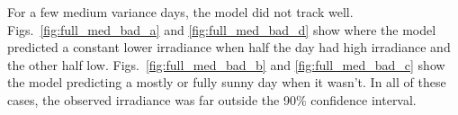For a few medium variance days, the model did not track well. Figs.~\ref{fig:full_med_bad_a} and \ref{fig:full_med_bad_d} show where the model predicted a constant lower irradiance when half the day had high irradiance and the other half low. Figs.~\ref{fig:full_med_bad_b} and \ref{fig:full_med_bad_c} show the model predicting a mostly or fully  sunny day when it wasn't. In all of these cases, the observed irradiance was far outside the 90\% confidence interval.
\begin{figure}[ht!]
    \centering
    \qquad
    \qquad
    \qquad

\end{figure}
